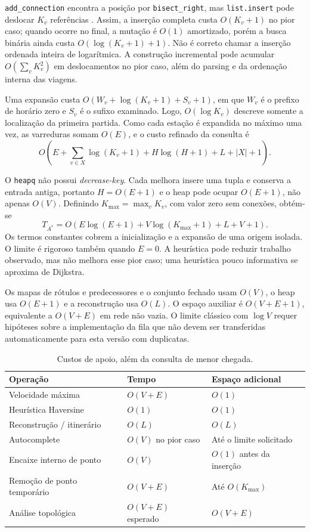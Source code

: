 \documentclass[12pt]{article}
\newcommand{\code}[1]{\texttt{#1}}
\begin{document}
\code{add\_connection} encontra a posição por \code{bisect\_right}, mas \code{list.insert} pode deslocar $K_v$ referências \cite{python}. Assim, a inserção completa custa $O(K_v+1)$ no pior caso; quando ocorre no final, a mutação é $O(1)$ amortizado, porém a busca binária ainda custa $O(\log(K_v+1)+1)$. Não é correto chamar a inserção ordenada inteira de logarítmica. A construção incremental pode acumular $O(\sum_v K_v^2)$ em deslocamentos no pior caso, além do parsing e da ordenação interna das viagens.

Uma expansão custa $O(W_v+\log(K_v+1)+S_v+1)$, em que $W_v$ é o prefixo de horário zero e $S_v$ é o sufixo examinado. Logo, $O(\log K_v)$ descreve somente a localização da primeira partida. Como cada estação é expandida no máximo uma vez, as varreduras somam $O(E)$, e o custo refinado da consulta é
\begin{equation}
O\left(E+\sum_{v\in X}\log(K_v+1)+H\log(H+1)+L+|X|+1\right).
\end{equation}

O \code{heapq} não possui \emph{decrease-key}. Cada melhora insere uma tupla e conserva a entrada antiga, portanto $H=O(E+1)$ e o heap pode ocupar $O(E+1)$, não apenas $O(V)$. Definindo $K_{\max}=\max_v K_v$, com valor zero sem conexões, obtém-se
\begin{equation}
T_{A^*}=O\left(E\log(E+1)+V\log(K_{\max}+1)+L+V+1\right).
\end{equation}
Os termos constantes cobrem a inicialização e a expansão de uma origem isolada. O limite é rigoroso também quando $E=0$. A heurística pode reduzir trabalho observado, mas não melhora esse pior caso; uma heurística pouco informativa se aproxima de Dijkstra.

Os mapas de rótulos e predecessores e o conjunto fechado usam $O(V)$, o heap usa $O(E+1)$ e a reconstrução usa $O(L)$. O espaço auxiliar é $O(V+E+1)$, equivalente a $O(V+E)$ em rede não vazia. O limite clássico com $\log V$ requer hipóteses sobre a implementação da fila que não devem ser transferidas automaticamente para esta versão com duplicatas.

\begin{table}[ht]
\centering
\caption{Custos de apoio, além da consulta de menor chegada.}
\begin{tabularx}{\textwidth}{@{}lXX@{}}
\toprule Operação & Tempo & Espaço adicional \\
\midrule
Velocidade máxima & $O(V+E)$ & $O(1)$ \\
Heurística Haversine & $O(1)$ & $O(1)$ \\
Reconstrução / itinerário & $O(L)$ & $O(L)$ \\
Autocomplete & $O(V)$ no pior caso & Até o limite solicitado \\
Encaixe interno de ponto & $O(V)$ & $O(1)$ antes da inserção \\
Remoção de ponto temporário & $O(V+E)$ & Até $O(K_{\max})$ \\
Análise topológica & $O(V+E)$ esperado & $O(V+E)$ \\
\bottomrule
\end{tabularx}
\end{table}
\end{document}
